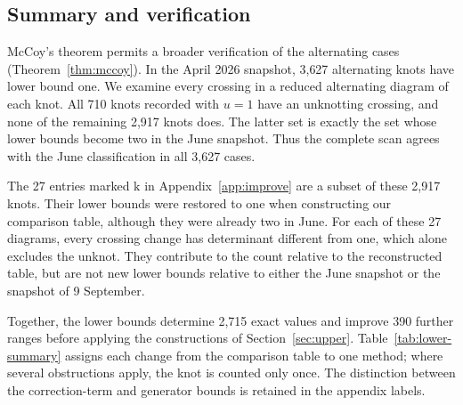 \documentclass[12pt, oneside]{amsart}
\newcommand{\nLowerImproved}{390}
\newcommand{\nExactLower}{2{,}715}
\newcommand{\nMcCoyKnots}{27}
\newcommand{\nMcCoyExcluded}{2{,}917}
\newcommand{\nMcCoyUnknotting}{710}
\newcommand{\nMcCoyVerified}{3{,}627}
\begin{document}
\subsection{Summary and verification}\label{sec:mccoy-results}

McCoy's theorem permits a broader verification of the alternating cases
(Theorem~\ref{thm:mccoy}). In the April 2026 snapshot,
\nMcCoyVerified{} alternating knots have lower bound one. We examine every
crossing in a reduced alternating diagram of each knot. All
\nMcCoyUnknotting{} knots recorded with $u=1$ have an unknotting crossing,
and none of the remaining \nMcCoyExcluded{} knots does. The latter set is
exactly the set whose lower bounds become two in the June snapshot. Thus the
complete scan agrees with the June classification in all
\nMcCoyVerified{} cases.

The \nMcCoyKnots{} entries marked $\mathrm{k}$ in
Appendix~\ref{app:improve} are a subset of these \nMcCoyExcluded{} knots.
Their lower bounds were restored to one when constructing our comparison
table, although they were already two in June. For each of these
\nMcCoyKnots{} diagrams, every crossing change has determinant different
from one, which alone excludes the unknot. They contribute to the count
relative to the reconstructed table, but are not new lower bounds relative
to either the June snapshot or the snapshot of 9 September.

Together, the lower bounds determine \nExactLower{} exact values and improve
\nLowerImproved{} further ranges before applying the constructions of
Section~\ref{sec:upper}.
Table~\ref{tab:lower-summary} assigns each change from the comparison table to one method; where several
obstructions apply, the knot is counted only once. The distinction between the
correction-term and generator bounds is retained in the appendix labels.
\end{document}
